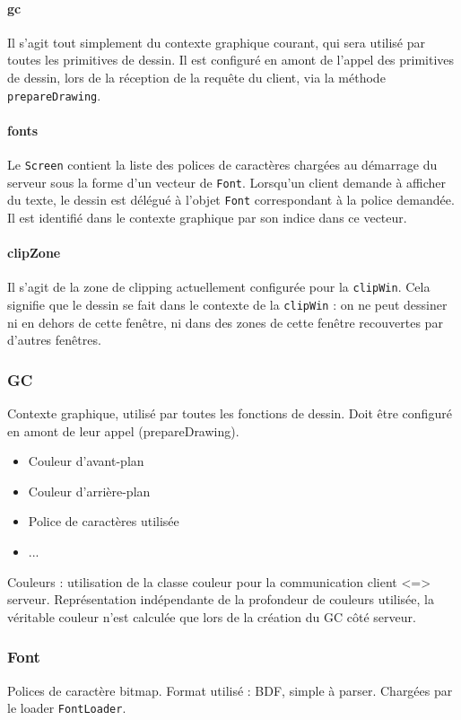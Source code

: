 \paragraph{gc}
Il s'agit tout simplement du contexte graphique courant, qui sera utilisé par toutes les primitives de dessin. Il est configuré en amont de l'appel des primitives de dessin, lors de la réception de la requête du client, via la méthode \verb|prepareDrawing|.

\paragraph{fonts}
Le \verb|Screen| contient la liste des polices de caractères chargées au démarrage du serveur sous la forme d'un vecteur de \verb|Font|. Lorsqu'un client demande à afficher du texte, le dessin est délégué à l'objet \verb|Font| correspondant à la police demandée. Il est identifié dans le contexte graphique par son indice dans ce vecteur.

\paragraph{clipZone}
Il s'agit de la zone de clipping actuellement configurée pour la \verb|clipWin|. Cela signifie que le dessin se fait dans le contexte de la \verb|clipWin| : on ne peut dessiner ni en dehors de cette fenêtre, ni dans des zones de cette fenêtre recouvertes par d'autres fenêtres.

\subsubsection{GC}
Contexte graphique, utilisé par toutes les fonctions de dessin. Doit être configuré en amont de leur appel (prepareDrawing).
\begin{itemize}
  \item Couleur d'avant-plan
  \item Couleur d'arrière-plan
  \item Police de caractères utilisée
  \item ...
\end{itemize}

Couleurs : utilisation de la classe couleur pour la communication client <=> serveur. Représentation indépendante de la profondeur de couleurs utilisée, la véritable couleur n'est calculée que lors de la création du GC côté serveur.

\subsubsection{Font}
Polices de caractère bitmap. Format utilisé : BDF, simple à parser. Chargées par le loader \verb|FontLoader|.

